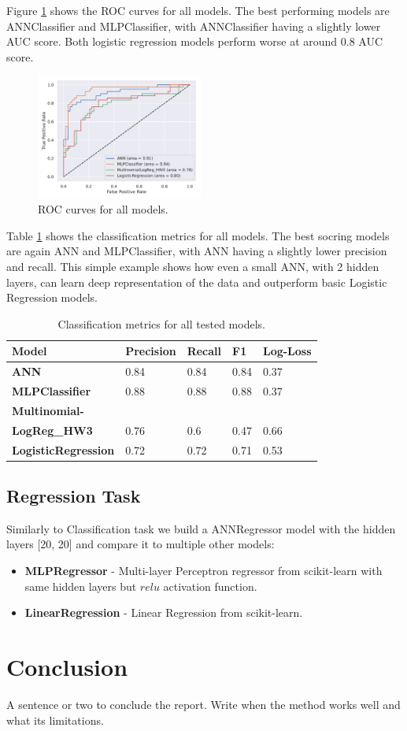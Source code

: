 \documentclass[9pt]{IEEEtran}
\begin{document}
Figure \ref{fig:roc} shows the ROC curves for all models.
The best performing models are ANNClassifier and MLPClassifier, with ANNClassifier having a slightly lower AUC score.
Both logistic regression models perform worse at around 0.8 AUC score.
\begin{figure}[H]
    \centering
    \includegraphics[width=0.488\textwidth]{roc_curve.pdf}
    \caption{ROC curves for all models.}
    \label{fig:roc}
\end{figure}
Table \ref{classification_scores} shows the classification metrics for all models.
The best socring models are again ANN and MLPClassifier, with ANN having a slightly lower precision and recall.
This simple example shows how even a small ANN, with 2 hidden layers, can learn deep representation of the data and outperform basic Logistic Regression models.
\begin{table}[!ht]
    \centering
    \begin{tabular}{lllll}
        \textbf{Model} & \textbf{Precision} & \textbf{Recall} & \textbf{F1} & \textbf{Log-Loss} \\ \hline
        \textbf{ANN} & 0.84 & 0.84 & 0.84 & 0.37 \\ 
        \textbf{MLPClassifier} & 0.88 & 0.88 & 0.88 & 0.37 \\ 
        \textbf{Multinomial-}\\ \textbf{LogReg\_HW3} & 0.76 & 0.6 & 0.47 & 0.66 \\ 
        \textbf{LogisticRegression} & 0.72 & 0.72 & 0.71 & 0.53 \\ 
    \end{tabular}
    \caption{Classification metrics for all tested models.}
    \label{classification_scores}
\end{table}

\subsection{Regression Task}
Similarly to Classification task we build a ANNRegressor model with the hidden layers [20, 20] and compare it to multiple other models:
\begin{itemize}
    \item \textbf{MLPRegressor} - Multi-layer Perceptron regressor from scikit-learn with same hidden layers but $relu$ activation function.
    \item \textbf{LinearRegression} - Linear Regression from scikit-learn.
\end {itemize}





\section{Conclusion}

A sentence or two to conclude the report. Write when the method works well and what its limitations.



\end{document}
